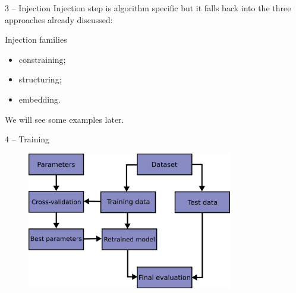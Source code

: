 \documentclass[presentation]{beamer}\mode<presentation>{\usetheme{AMSBolognaFC}}
\begin{document}

\begin{frame}[c]{3 -- Injection}
    Injection step is algorithm specific but it falls back into the three approaches already discussed:
    \begin{block}{Injection families}
        \begin{itemize}
            \item constraining;
            \item structuring;
            \item embedding.
        \end{itemize}
    \end{block}
    We will see some examples later.
\end{frame}

\begin{frame}[c]{4 -- Training}
    \begin{figure}
        \centering
        \includegraphics[width=0.8\textwidth]{figures/training-workflow.png}
    \end{figure}
\end{frame}
\end{document}
